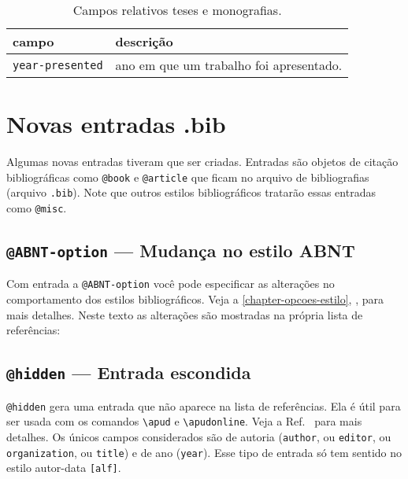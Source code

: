 \documentclass[a4paper]{ltxdoc}
\begin{document}
\begin{table}[htbp]
\caption{Campos relativos teses e monografias.}
\label{tabela-campos-teses}

\begin{center}
\begin{tabular}{lp{8cm}}\toprule
campo & descrição \\ \midrule
\texttt{year-presented} & ano em que um trabalho foi apresentado.
\\ \bottomrule
\end{tabular}
\end{center}
\end{table}


\section{Novas entradas .bib}

Algumas novas entradas tiveram que ser criadas. Entradas são objetos de citação
bibliográficas como \verb+@book+ e \verb+@article+ que ficam no arquivo de
bibliografias (arquivo \texttt{.bib}). Note que outros estilos bibliográficos 
tratarão essas entradas como \verb+@misc+.

\subsection{\texttt{@ABNT-option} --- Mudança no estilo ABNT}

Com entrada a \texttt{@ABNT-option} você pode especificar as alterações no
comportamento dos estilos bibliográficos. Veja a
\autoref{chapter-opcoes-estilo}, , para
mais detalhes. Neste texto as alterações são mostradas na própria lista de
referências:

\subsection{\texttt{@hidden} --- Entrada escondida}

\DescribeMacro{\apud}\DescribeMacro{\apudeonline}
\texttt{@hidden} gera uma entrada que não aparece na lista de referências. Ela é
útil para ser usada com os comandos \verb+\apud+ e \verb+\apudonline+. Veja a
Ref.~ para mais detalhes. Os únicos campos
considerados são de autoria (\texttt{author}, ou \texttt{editor}, ou \texttt{
organization}, ou \texttt{title}) e de ano (\texttt{year}). Esse tipo de entrada só
tem sentido no estilo autor-data \texttt{[alf]}.
\end{document}

